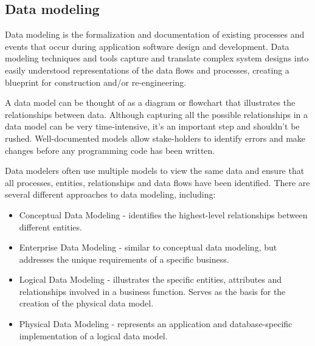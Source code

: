 \documentclass[]{report}
\begin{document}
    \subsection*{Data modeling }
Data modeling is the formalization and documentation of existing processes and events that occur during application software design and development. Data modeling techniques and tools capture and translate complex system designs into easily understood representations of the data flows and processes, creating a blueprint for construction and/or re-engineering.

A data model can be thought of as a diagram or flowchart that illustrates the relationships between data. Although capturing all the possible relationships in a data model can be very time-intensive, it's an important step and shouldn't be rushed. Well-documented models allow stake-holders to identify errors and make changes before any programming code has been written.

Data modelers often use multiple models to view the same data and ensure that all processes, entities, relationships and data flows have been identified. There are several different approaches to data modeling, including:
\begin{itemize}
\item  Conceptual Data Modeling - identifies the highest-level relationships between different entities.

\item  Enterprise Data Modeling - similar to conceptual data modeling, but addresses the unique requirements of a specific business. 

\item  Logical Data Modeling - illustrates the specific entities, attributes and relationships involved in a business function. Serves as the basis for the creation of the physical data model.

\item  Physical Data Modeling - represents an application and database-specific implementation of a logical data model.
    \end{itemize}
\end{document}
